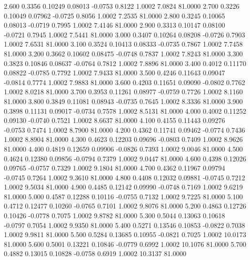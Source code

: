    2.600   0.3356   0.10249   0.08013  -0.0753   0.8122   1.0002   7.0824  81.0000
   2.700   0.3226   0.10049   0.07962  -0.0725   0.8056   1.0002   7.2535  81.0000
   2.800   0.3245   0.10065   0.08013  -0.0719   0.7995   1.0002   7.4146  81.0000
   2.900   0.3313   0.10147   0.08100  -0.0721   0.7945   1.0002   7.5441  81.0000
   3.000   0.3407   0.10264   0.08208  -0.0726   0.7903   1.0002   7.6531  81.0000
   3.100   0.3524   0.10413   0.08333  -0.0735   0.7867   1.0002   7.7458  81.0000
   3.200   0.3662   0.10602   0.08475  -0.0748   0.7837   1.0002   7.8243  81.0000
   3.300   0.3823   0.10846   0.08637  -0.0764   0.7812   1.0002   7.8896  81.0000
   3.400   0.4012   0.11170   0.08822  -0.0785   0.7792   1.0002   7.9433  81.0000
   3.500   0.4246   0.11643   0.09047  -0.0814   0.7774   1.0002   7.9883  81.0000
   3.600   0.4203   0.11651   0.09090  -0.0802   0.7762   1.0002   8.0218  81.0000
   3.700   0.3953   0.11261   0.08977  -0.0759   0.7726   1.0002   8.1160  81.0000
   3.800   0.3849   0.11081   0.08943  -0.0735   0.7645   1.0002   8.3336  81.0000
   3.900   0.3898   0.11131   0.09017  -0.0734   0.7578   1.0002   8.5131  81.0000
   4.000   0.4002   0.11252   0.09130  -0.0740   0.7521   1.0002   8.6637  81.0000
   4.100   0.4155   0.11443   0.09276  -0.0753   0.7474   1.0002   8.7900  81.0000
   4.200   0.4362   0.11741   0.09462  -0.0774   0.7436   1.0002   8.8904  81.0000
   4.300   0.4623   0.12203   0.09696  -0.0803   0.7409   1.0002   8.9626  81.0000
   4.400   0.4819   0.12659   0.09906  -0.0826   0.7393   1.0002   9.0046  81.0000
   4.500   0.4624   0.12380   0.09856  -0.0794   0.7379   1.0002   9.0447  81.0000
   4.600   0.4398   0.12026   0.09765  -0.0757   0.7329   1.0002   9.1804  81.0000
   4.700   0.4362   0.11967   0.09794  -0.0745   0.7264   1.0002   9.3610  81.0000
   4.800   0.4408   0.12032   0.09881  -0.0745   0.7212   1.0002   9.5034  81.0000
   4.900   0.4485   0.12142   0.09990  -0.0748   0.7169   1.0002   9.6219  81.0000
   5.000   0.4587   0.12288   0.10116  -0.0755   0.7132   1.0002   9.7225  81.0000
   5.100   0.4712   0.12477   0.10260  -0.0765   0.7101   1.0002   9.8076  81.0000
   5.200   0.4863   0.12726   0.10426  -0.0778   0.7075   1.0002   9.8782  81.0000
   5.300   0.5044   0.13063   0.10618  -0.0797   0.7054   1.0002   9.9350  81.0000
   5.400   0.5271   0.13546   0.10853  -0.0822   0.7038   1.0002   9.9811  81.0000
   5.500   0.5284   0.13685   0.10955  -0.0821   0.7025   1.0002  10.0173  81.0000
   5.600   0.5001   0.13221   0.10846  -0.0779   0.6992   1.0002  10.1076  81.0000
   5.700   0.4882   0.13015   0.10828  -0.0758   0.6919   1.0002  10.3137  81.0000
